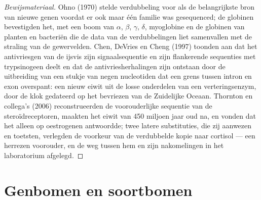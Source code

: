 \begin{proof}[Bewijsmateriaal]
Ohno (1970) stelde verdubbeling voor als de belangrijkste bron van
nieuwe genen voordat er ook maar één familie was gesequenced; de
globinen bevestigden het, met een boom van $\alpha$, $\beta$,
$\gamma$, $\delta$, myoglobine en de globinen van planten en bacteriën
die de data van de verdubbelingen liet samenvallen met de straling van
de gewervelden. Chen, DeVries en Cheng (1997) toonden aan dat het
antivriesgen van de ijsvis zijn signaalsequentie en zijn flankerende
sequenties met trypsinogeen deelt en dat de antivriesherhalingen zijn
ontstaan door de uitbreiding van een stukje van negen nucleotiden dat
een grens tussen intron en exon overspant: een nieuw eiwit uit de losse
onderdelen van een verteringsenzym, door de klok gedateerd op het
bevriezen van de Zuidelijke Oceaan. Thornton en collega's (2006)
reconstrueerden de voorouderlijke sequentie van de steroïdreceptoren,
maakten het eiwit van 450 miljoen jaar oud na, en vonden dat het alleen
op oestrogenen antwoordde; twee latere substituties, die zij aanwezen
en toetsten, verlegden de voorkeur van de verdubbelde kopie naar
cortisol --- een herrezen voorouder, en de weg tussen hem en zijn
nakomelingen in het laboratorium afgelegd.
\end{proof}

\section{Genbomen en soortbomen}

